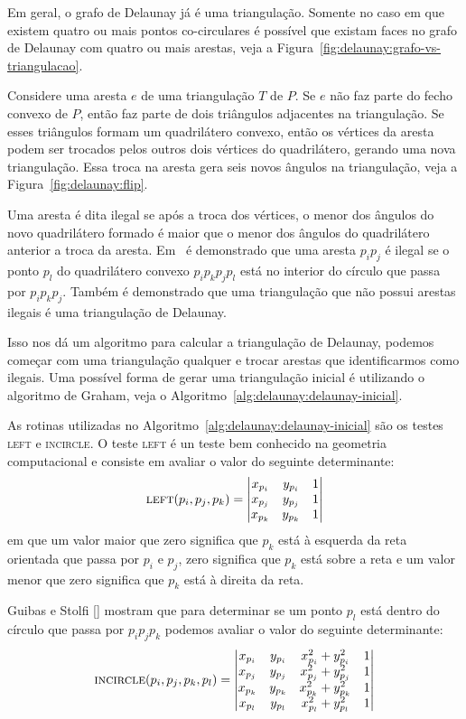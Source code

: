 Em geral, o grafo de Delaunay já é uma triangulação.
Somente no caso em que existem quatro ou mais pontos co-circulares é possível que existam faces no
grafo de Delaunay com quatro ou mais arestas, veja a
Figura~\ref{fig:delaunay:grafo-vs-triangulacao}.

Considere uma aresta $e$ de uma triangulação $T$ de $P$.
Se $e$ não faz parte do fecho convexo de $P$, então faz parte de dois triângulos adjacentes na
triangulação.
Se esses triângulos formam um quadrilátero convexo, então os vértices da aresta podem ser trocados
pelos outros dois vértices do quadrilátero, gerando uma nova triangulação.
Essa troca na aresta gera seis novos ângulos na triangulação, veja a
Figura~\ref{fig:delaunay:flip}.

Uma aresta é dita ilegal se após a troca dos vértices, o menor dos ângulos do novo quadrilátero
formado é maior que o menor dos ângulos do quadrilátero anterior a troca da aresta.
Em~\cite{computational-geometry} é demonstrado que uma aresta $p_{i}p_{j}$ é ilegal se o ponto
$p_{l}$ do quadrilátero convexo $p_{i}p_{k}p_{j}p_{l}$ está no interior do círculo que passa por
$p_{i}p_{k}p_{j}$.
Também é demonstrado que uma triangulação que não possui arestas ilegais é uma triangulação de
Delaunay.

Isso nos dá um algoritmo para calcular a triangulação de Delaunay, podemos começar com uma
triangulação qualquer e trocar arestas que identificarmos como ilegais.
Uma possível forma de gerar uma triangulação inicial é utilizando o algoritmo de Graham, veja o
Algoritmo~\ref{alg:delaunay:delaunay-inicial}.

As rotinas utilizadas no Algoritmo~\ref{alg:delaunay:delaunay-inicial} são os testes \textsc{left}
e \textsc{incircle}.
O teste \textsc{left} é un teste bem conhecido na geometria computacional e consiste em avaliar o
valor do seguinte determinante:
$$\textsc{left}(p_i, p_j, p_k) =
\begin{vmatrix}
    x_{p_i} & y_{p_i} & 1 \\
    x_{p_j} & y_{p_j} & 1 \\
    x_{p_k} & y_{p_k} & 1
\end{vmatrix}$$
em que um valor maior que zero significa que $p_k$ está à esquerda da reta orientada que passa por
$p_i$ e $p_j$, zero significa que $p_k$ está sobre a reta e um valor menor que zero significa que
$p_k$ está à direita da reta.

Guibas e Stolfi [\cite{guibas-stolfi}] mostram que para determinar se um ponto $p_l$ está dentro
do círculo que passa por $p_{i}p_{j}p_{k}$ podemos avaliar o valor do seguinte determinante:
$$\textsc{incircle}(p_i, p_j, p_k, p_l) =
\begin{vmatrix}
    x_{p_i} & y_{p_i} & x_{p_i}^2 + y_{p_i}^2 & 1 \\
    x_{p_j} & y_{p_j} & x_{p_j}^2 + y_{p_j}^2 & 1 \\
    x_{p_k} & y_{p_k} & x_{p_k}^2 + y_{p_k}^2 & 1 \\
    x_{p_l} & y_{p_l} & x_{p_l}^2 + y_{p_l}^2 & 1
\end{vmatrix}$$

